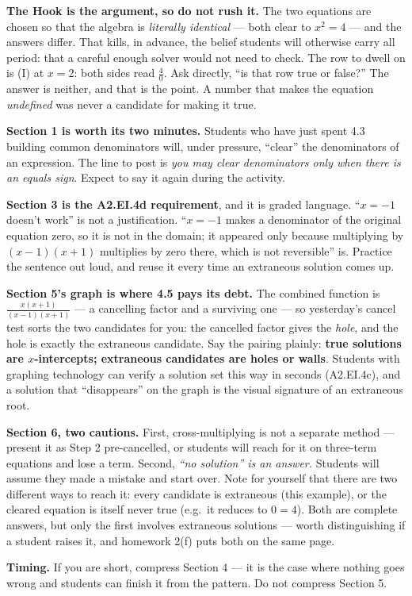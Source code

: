 \documentclass[10pt]{article}
\begin{document}
\begin{teachernote}
\textbf{The Hook is the argument, so do not rush it.} The two equations are chosen so that the algebra
is \emph{literally identical} --- both clear to $x^2=4$ --- and the answers differ. That kills, in
advance, the belief students will otherwise carry all period: that a careful enough solver would not
need to check. The row to dwell on is (I) at $x=2$: both sides read $\frac40$. Ask directly, ``is that
row true or false?'' The answer is neither, and that is the point. A number that makes the equation
\emph{undefined} was never a candidate for making it true.

\vspace{3pt}
\textbf{Section 1 is worth its two minutes.} Students who have just spent 4.3 building common
denominators will, under pressure, ``clear'' the denominators of an expression. The line to post is
\emph{you may clear denominators only when there is an equals sign}. Expect to say it again during the
activity.

\vspace{3pt}
\textbf{Section 3 is the A2.EI.4d requirement}, and it is graded language. ``$x=-1$ doesn't work'' is
not a justification. ``$x=-1$ makes a denominator of the original equation zero, so it is not in the
domain; it appeared only because multiplying by $(x-1)(x+1)$ multiplies by zero there, which is not
reversible'' is. Practice the sentence out loud, and reuse it every time an extraneous solution comes
up.

\vspace{3pt}
\textbf{Section 5's graph is where 4.5 pays its debt.} The combined function is
$\frac{x(x+1)}{(x-1)(x+1)}$ --- a cancelling factor and a surviving one --- so yesterday's cancel test
sorts the two candidates for you: the cancelled factor gives the \emph{hole}, and the hole is exactly
the extraneous candidate. Say the pairing plainly: \textbf{true solutions are $x$-intercepts;
extraneous candidates are holes or walls}. Students with graphing technology can verify a solution set
this way in seconds (A2.EI.4c), and a solution that ``disappears'' on the graph is the visual signature
of an extraneous root.

\vspace{3pt}
\textbf{Section 6, two cautions.} First, cross-multiplying is not a separate method --- present it as
Step 2 pre-cancelled, or students will reach for it on three-term equations and lose a term. Second,
\emph{``no solution'' is an answer.} Students will assume they made a mistake and start over. Note for
yourself that there are two different ways to reach it: every candidate is extraneous (this example),
or the cleared equation is itself never true (e.g.\ it reduces to $0=4$). Both are complete answers,
but only the first involves extraneous solutions --- worth distinguishing if a student raises it, and
homework 2(f) puts both on the same page.

\vspace{3pt}
\textbf{Timing.} If you are short, compress Section 4 --- it is the case where nothing goes wrong and
students can finish it from the pattern. Do not compress Section 5.
\end{teachernote}
\end{document}
